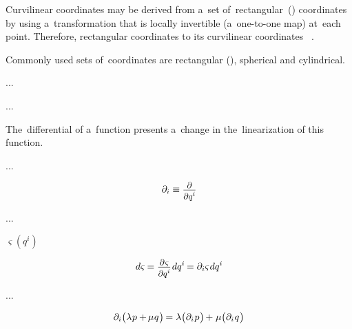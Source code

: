 Curvilinear coordinates may be derived from a~set of~rectangular~() coordinates by using a~transformation that is locally invertible (a~one-to-one map) at~each point.
Therefore, rectangular coordinates   to its curvilinear coordinates ~.

Commonly used sets of~coordinates are rectangular (), spherical and cylindrical.

...

...

The~differential of a~function presents a~change in the~linearization of this function.

...


\nopagebreak\vspace{-0.4em}\begin{equation*}
\partial_i \equiv \scalebox{0.9}{$ \displaystyle\frac{\raisebox{-0.2em}{$\partial$}}{\raisebox{-0.1em}{$\partial q^i$}} $}
\end{equation*}

...

 ${\varsigma(q^i)}$

\nopagebreak\vspace{-0.4em}\begin{equation}
d\varsigma \hspace{-0.1ex}
= \scalebox{0.9}{$ \displaystyle\frac{\raisebox{-0.2em}{$\partial \hspace{.15ex} \varsigma$}}{\raisebox{-0.1em}{$\partial q^i$}} $} \hspace{.2ex} dq^i \hspace{-0.2ex}
= \partial_i \varsigma \hspace{.15ex} dq^i
\end{equation}

...


\nopagebreak\vspace{-0.4em}\begin{equation}\label{linearityordifferentiation}
\partial_i \bigl( \lambda \hspace{.1ex} p + \hspace{-0.2ex} \mu \hspace{.1ex} q \hspace{.1ex} \bigr) \hspace{-0.2ex}
= \lambda \bigl( \partial_i \hspace{.1ex} p \hspace{.1ex} \bigr) \hspace{-0.2ex} + \hspace{.1ex}
\mu \bigl( \partial_i \hspace{.1ex} q \hspace{.1ex} \bigr)
\end{equation}


